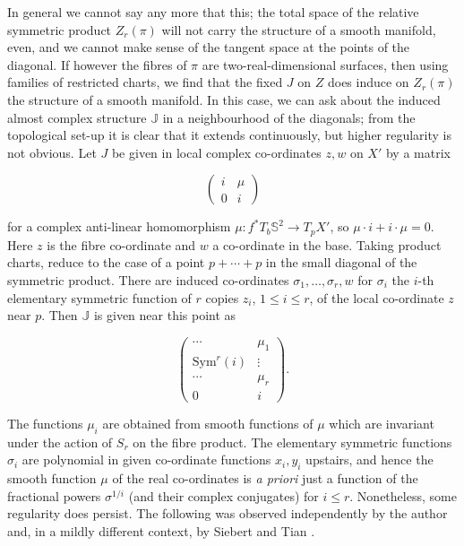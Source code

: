 \documentclass[10pt]{article}
\newcommand{\sss}{\mathbb{S}}
\newcommand{\Sym}{\mathrm{Sym}}
\begin{document}
\vspace{0.2cm}

\noindent In general we cannot say any more that this;  the total
space of the relative symmetric product $Z_r(\pi)$ will not carry the
structure of a smooth manifold, even, and we cannot make sense of the
tangent space at the points of the diagonal.  If however the fibres of
$\pi$ are two-real-dimensional surfaces, then using families of
restricted charts, we find that the fixed $J$ on $Z$ does
induce on $Z_r(\pi)$ the structure of a smooth manifold.  In this
case, we can ask about the induced almost complex
structure $\mathbb{J}$ in a neighbourhood of the diagonals; from the
topological set-up it is clear that it extends continuously, but
higher regularity is not obvious.  Let $J$ be given in local complex
co-ordinates $z,w$ on $X'$ by a matrix 

$$\left( \begin{array}{cc} i & \mu \\ 0 & i \end{array} \right)$$

\noindent for a complex anti-linear homomorphism $\mu: f^* T_b \sss^2
\rightarrow T_p X'$, so $\mu \cdot i + i \cdot \mu = 0$.  Here $z$ is
the fibre co-ordinate and $w$ a co-ordinate in the base.  Taking
product charts, reduce to the case of a point 
$p+\cdots+p$ in the small diagonal of the symmetric product.  There are
induced co-ordinates $\sigma_1, \ldots, \sigma_r, w$ for $\sigma_i$
the $i$-th elementary symmetric function of $r$ copies $z_i$, $1 \leq
i \leq r$, of the local co-ordinate $z$ near $p$.  Then $\mathbb{J}$ is given
near this point as 

$$\left( \begin{array}{cc} \cdots & \mu_1 \\ \Sym^r(i) & \vdots \\ \cdots &
    \mu_r \\ 0 & i \end{array} \right).$$

\noindent The functions $\mu_i$ are obtained from smooth functions of
$\mu$ which are invariant under the action of $S_r$ on the fibre
product.  The elementary symmetric functions $\sigma_i$ are polynomial
in given co-ordinate functions $x_i, y_i$ upstairs, and hence the smooth
function $\mu$ of the real co-ordinates is \emph{a priori} just a
function of the 
fractional powers $\sigma^{1/i}$ (and their complex conjugates) for $i
\leq r$.   Nonetheless, some regularity does persist.
The following was observed independently by the
author and, in a mildly different context, by Siebert and Tian
\cite{Sieb:weier}.  
\end{document}
